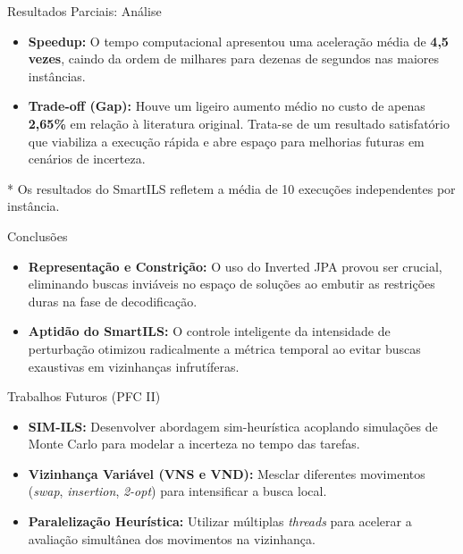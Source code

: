 \documentclass{beamer}
\begin{document}
\begin{frame}{Resultados Parciais: Análise}
    \begin{itemize}
        \item \textbf{Speedup:} O tempo computacional apresentou uma aceleração média de \textbf{4,5 vezes}, caindo da ordem de milhares para dezenas de segundos nas maiores instâncias.
        \vspace{0.5cm}
        \item \textbf{Trade-off (Gap):} Houve um ligeiro aumento médio no custo de apenas \textbf{2,65\%} em relação à literatura original. Trata-se de um resultado satisfatório que viabiliza a execução rápida e abre espaço para melhorias futuras em cenários de incerteza.
    \end{itemize}
    \vspace{0.5cm}
    \scriptsize{* Os resultados do SmartILS refletem a média de 10 execuções independentes por instância.}
\end{frame}

\begin{frame}{Conclusões}
    \begin{itemize}
        \item \textbf{Representação e Constrição:} O uso do Inverted JPA provou ser crucial, eliminando buscas inviáveis no espaço de soluções ao embutir as restrições duras na fase de decodificação.
        \vspace{0.5cm}
        \item \textbf{Aptidão do SmartILS:} O controle inteligente da intensidade de perturbação otimizou radicalmente a métrica temporal ao evitar buscas exaustivas em vizinhanças infrutíferas.
    \end{itemize}
\end{frame}

\begin{frame}{Trabalhos Futuros (PFC II)}
    \begin{itemize}
        \item \textbf{SIM-ILS:} Desenvolver abordagem sim-heurística acoplando simulações de Monte Carlo para modelar a incerteza no tempo das tarefas.
        \vspace{0.3cm}
        \item \textbf{Vizinhança Variável (VNS e VND):} Mesclar diferentes movimentos (\textit{swap}, \textit{insertion}, \textit{2-opt}) para intensificar a busca local.
        \vspace{0.3cm}
        \item \textbf{Paralelização Heurística:} Utilizar múltiplas \textit{threads} para acelerar a avaliação simultânea dos movimentos na vizinhança.
    \end{itemize}
\end{frame}
\end{document}

